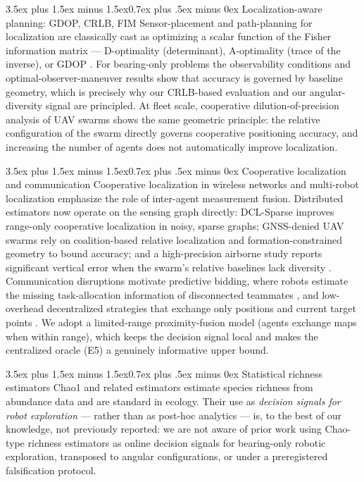 \documentclass[journal]{IEEEtran}
\makeatletter
\renewcommand{\subsection}{\@startsection{subsection}{2}{\z@}%
{3.5ex plus 1.5ex minus 1.5ex}{0.7ex plus .5ex minus 0ex}%
{\normalfont\normalsize\bfseries}}
\makeatother
\begin{document}
\subsection{Localization-aware planning: GDOP, CRLB, FIM}
Sensor-placement and path-planning for localization are classically cast as
optimizing a scalar function of the Fisher information matrix --- D-optimality
(determinant), A-optimality (trace of the inverse), or GDOP
\cite{Kaplan2017, Ucinski2005, Martinez2006, Krause2008}. For bearing-only
problems the observability conditions \cite{NardoneAidala1981} and
optimal-observer-maneuver results \cite{Passerieux1998, Oshman1999,
Dogancay2012} show that accuracy is governed by baseline geometry, which is
precisely why our CRLB-based evaluation \cite{Cramér1946, Rao1945} and our
angular-diversity signal are principled. At fleet scale, cooperative
dilution-of-precision analysis of UAV swarms \cite{Chen2020} shows the same
geometric principle: the relative configuration of the swarm directly governs
cooperative positioning accuracy, and increasing the number of agents does not
automatically improve localization.

\subsection{Cooperative localization and communication}
Cooperative localization in wireless networks \cite{Patwari2005,
Wymeersch2009} and multi-robot localization \cite{Ristic2004} emphasize the
role of inter-agent measurement fusion. Distributed estimators now operate on
the sensing graph directly: DCL-Sparse \cite{Sagale2024} improves range-only
cooperative localization in noisy, sparse graphs; GNSS-denied UAV swarms rely
on coalition-based relative localization \cite{Ruan2022} and
formation-constrained geometry \cite{Li2026} to bound accuracy; and a
high-precision airborne study reports significant vertical error when the
swarm's relative baselines lack diversity \cite{Liu2026}. Communication
disruptions motivate predictive bidding, where robots estimate the missing
task-allocation information of disconnected teammates \cite{Woosley2021}, and
low-overhead decentralized strategies that exchange only positions and current
target points \cite{Batinovic2020}. We adopt a limited-range proximity-fusion
model (agents exchange maps when within range), which keeps the decision signal
local and makes the centralized oracle (E5) a genuinely informative upper
bound.

\subsection{Statistical richness estimators}
Chao1 and related estimators \cite{Chao1984, ChaoLee1992, ChaoYang1993,
BurnhamOverton1978} estimate species richness from abundance data and are
standard in ecology. Their use as \emph{decision signals for robot
exploration} --- rather than as post-hoc analytics --- is, to the best of our
knowledge, not previously reported: we are not aware of prior work using
Chao-type richness estimators as online decision signals for bearing-only
robotic exploration, transposed to angular configurations, or under a
preregistered falsification protocol.
\end{document}
